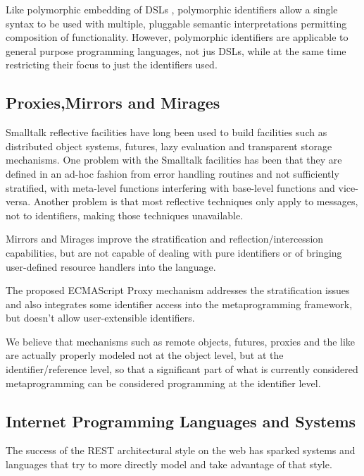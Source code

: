 \documentclass[preprint,authoryear]{acm_proc_article-sp}
\begin{document}
Like polymorphic embedding of DSLs \cite{polydsl}, polymorphic identifiers allow
a single syntax to be used with multiple, pluggable semantic interpretations permitting
composition of functionality\cite{embeddeddsl}.  However, polymorphic identifiers
are applicable to general purpose programming languages, not jus DSLs, while
at the same time restricting their focus to just the identifiers used.

\subsection{Proxies,Mirrors and Mirages}

Smalltalk reflective facilities \cite{reflective-st} have long been used to build
facilities such as distributed object systems, futures, lazy evaluation and
transparent storage mechanisms.  One problem with the Smalltalk facilities
has been that they are defined in an ad-hoc fashion from error handling routines
and not sufficiently stratified, with meta-level functions
interfering with base-level functions and vice-versa.  Another problem is that
most reflective techniques only apply to messages, not to identifiers, making 
those techniques unavailable.

Mirrors \cite{mirrors} and Mirages \cite{mirages} improve the stratification and
reflection/intercession capabilities, but are not capable of dealing with pure
identifiers or of bringing user-defined resource handlers into the language.

The proposed ECMAScript Proxy mechanism \cite{VanCutsemMiller} addresses
the stratification issues and also integrates some identifier access into the 
metaprogramming framework, but doesn't allow user-extensible identifiers.

We believe that mechanisms such as remote objects, futures, proxies and the like
are actually properly modeled not at the object level, but at the identifier/reference
level, so that a significant part of what is currently considered metaprogramming
can be considered programming at the identifier level.

\subsection{Internet Programming Languages and Systems}

The success of the REST architectural style\cite{fielding-rest} on the web has sparked
systems and languages that try to more directly model and take advantage of that
style.
\end{document}

